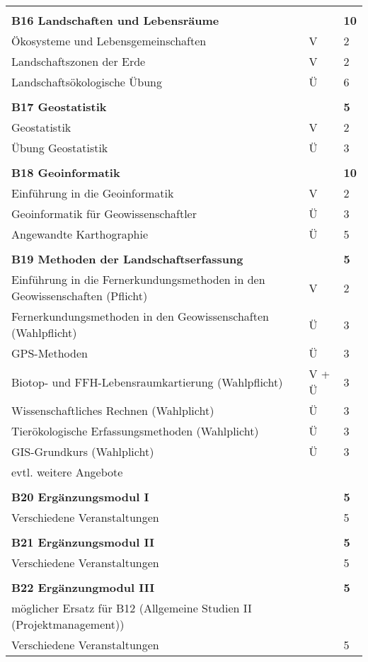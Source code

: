\begin{longtable}{p{} p{} p{}}
&&\\
\textbf{B16 Landschaften und Lebensräume} & & \textbf{10}\\
Ökosysteme und Lebensgemeinschaften & V & 2\\
Landschaftszonen der Erde & V & 2\\
Landschaftsökologische Übung & Ü & 6\\
&&\\
\textbf{B17 Geostatistik} && \textbf{5}\\
Geostatistik & V & 2\\
Übung Geostatistik & Ü & 3\\
&&\\
\textbf{B18 Geoinformatik} && \textbf{10}\\
Einführung in die Geoinformatik & V & 2\\
Geoinformatik für Geowissenschaftler & Ü & 3\\
Angewandte Karthographie & Ü & 5\\
&&\\
\textbf{B19 Methoden der Landschaftserfassung}&&\textbf{5}\\
Einführung in die Fernerkundungsmethoden in den Geowissenschaften (Pflicht) & V & 2\\
Fernerkundungsmethoden in den Geowissenschaften (Wahlpflicht) & Ü & 3\\
GPS-Methoden & Ü & 3\\
Biotop- und FFH-Lebensraumkartierung (Wahlpflicht) & V + Ü & 3\\
Wissenschaftliches Rechnen (Wahlplicht) & Ü & 3\\
Tierökologische Erfassungsmethoden (Wahlplicht) & Ü & 3\\
GIS-Grundkurs (Wahlplicht)  & Ü & 3\\
evtl. weitere Angebote\\
&&\\
\textbf{B20 Ergänzungsmodul I} && \textbf{5}\\
Verschiedene Veranstaltungen & & 5\\
&&\\
\textbf{B21 Ergänzungsmodul II} && \textbf{5}\\
Verschiedene Veranstaltungen & & 5\\
&&\\
\textbf{B22 Ergänzungmodul III} && \textbf{5}\\
möglicher Ersatz für B12 (Allgemeine Studien II (Projektmanagement))\\
Verschiedene Veranstaltungen & & 5\\

\end{longtable}
